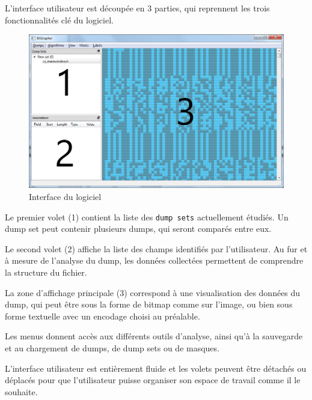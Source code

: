 L'interface utilisateur est découpée en 3 parties, qui reprennent les trois fonctionnalités clé du logiciel.

\begin{figure}[!h]
  \begin{center}
  \includegraphics[width=\textwidth]{res/03-2-interface.png}
  \caption{Interface du logiciel}
  \label{03-2-interface}
  \end{center}
\end{figure}

Le premier volet (1) contient la liste des \texttt{dump sets} actuellement étudiés. Un dump set peut contenir plusieurs dumps, qui seront comparés entre eux.

Le second volet (2) affiche la liste des champs identifiés par l'utilisateur. Au fur et à mesure de l'analyse du dump, les données collectées permettent de comprendre la structure du fichier.

La zone d'affichage principale (3) correspond à une visualisation des données du dump, qui peut être sous la forme de bitmap comme sur l'image, ou bien sous forme textuelle avec un encodage choisi au préalable.

Les menus donnent accès aux différents outils d'analyse, ainsi qu'à la sauvegarde et au chargement de dumps, de dump sets ou de masques.

L'interface utilisateur est entièrement fluide et les volets peuvent être détachés ou déplacés pour que l'utilisateur puisse organiser son espace de travail comme il le souhaite.
